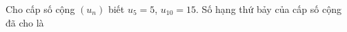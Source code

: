 \begin{ex}
Cho cấp số cộng $(u_n)$ biết $u_5=5$, $u_{10}=15$. Số hạng thứ bảy của cấp số cộng đã cho là
\end{ex}
